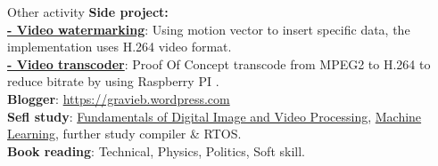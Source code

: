 \documentclass{resume}
\begin{document}
  \begin{rSection}{Other activity}
    {\bf Side project:} \\
    \textbf{\href{https://github.com/truongpt/video_watermarking}{- Video watermarking}}: Using motion vector to insert specific data, the implementation uses H.264 video format. \\
    \textbf{\href{https://github.com/truongpt/omxtranscoder}{- Video transcoder}}: Proof Of Concept transcode from MPEG2 to H.264 to reduce bitrate by using Raspberry PI . \\
    {\bf Blogger}: \href{https://gravieb.wordpress.com/}{https://gravieb.wordpress.com} \\
    {\bf Sefl study}: \href{https://www.coursera.org/account/accomplishments/verify/68DQB2KRJ5Y6}{Fundamentals of Digital Image and Video Processing}, \href{https://www.coursera.org/account/accomplishments/verify/S9U9FDD57TXM}{Machine Learning}, further study compiler \& RTOS. \\
    {\bf Book reading}: Technical, Physics, Politics, Soft skill. \\

  \end{rSection}
\end{document}
